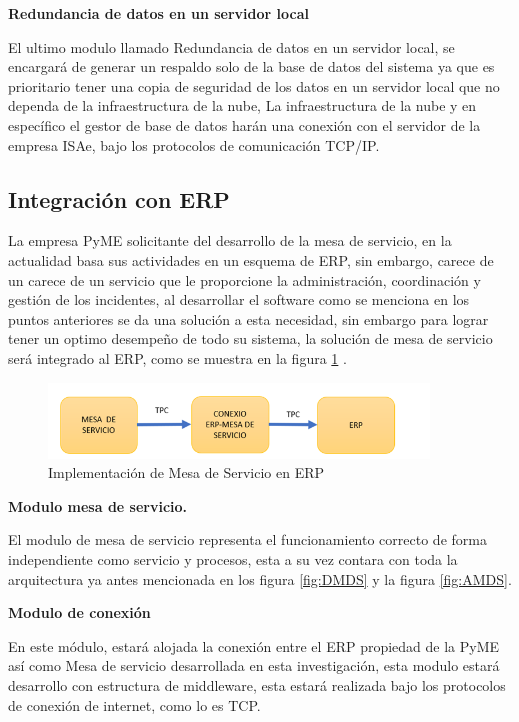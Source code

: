  \textbf{Redundancia de datos en un servidor local} 
 
El ultimo modulo llamado Redundancia de datos en un servidor local, se encargará de generar un respaldo solo de la base de datos del sistema ya que es prioritario tener una copia de seguridad de los datos en un servidor local que no dependa de la infraestructura de la nube, La infraestructura de la nube y en específico el gestor de base de datos harán una conexión con el servidor de la empresa ISAe, bajo los protocolos de comunicación TCP/IP.

\subsection{Integración con ERP}

La empresa PyME solicitante del desarrollo de la mesa de servicio, en la actualidad basa sus actividades en un esquema de ERP, sin embargo, carece de un carece de un servicio que le proporcione la administración, coordinación y gestión de los incidentes, al desarrollar el software como se menciona en los puntos anteriores se da una solución a esta necesidad, sin embargo para lograr tener un optimo desempeño de todo su sistema, la solución de  mesa de servicio será integrado al ERP, como se muestra en la figura \ref{fig:ERP-MDS} .
\begin{figure}[htb]
	\centering
	\includegraphics[width=0.9\textwidth]{Capitulo1/Img/ERP-MDS}
	\caption{Implementación de Mesa de Servicio en ERP}
	\label{fig:ERP-MDS}
	
\end{figure}


\textbf{Modulo mesa de servicio.}

El modulo  de  mesa de servicio representa el funcionamiento correcto de forma independiente como servicio y procesos, esta a su vez contara con toda la arquitectura ya antes mencionada en los figura \ref{fig:DMDS} y  la figura \ref{fig:AMDS}.

\textbf{Modulo de conexión }

En este módulo, estará alojada la conexión entre el ERP propiedad de la PyME así como Mesa de servicio desarrollada en esta investigación, esta modulo estará desarrollo con estructura de middleware, esta estará realizada bajo los protocolos de conexión de internet, como lo es TCP.

